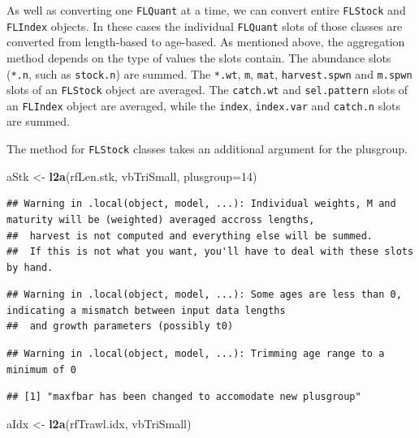 \documentclass[
]{book}
\newenvironment{Shaded}{\begin{snugshade}}{\end{snugshade}}
\newcommand{\AttributeTok}[1]{\textcolor[rgb]{0.13,0.29,0.53}{#1}}
\newcommand{\DecValTok}[1]{\textcolor[rgb]{0.00,0.00,0.81}{#1}}
\newcommand{\FunctionTok}[1]{\textcolor[rgb]{0.13,0.29,0.53}{\textbf{#1}}}
\newcommand{\NormalTok}[1]{#1}
\newcommand{\OtherTok}[1]{\textcolor[rgb]{0.56,0.35,0.01}{#1}}
\begin{document}
As well as converting one \texttt{FLQuant} at a time, we can convert entire \texttt{FLStock} and \texttt{FLIndex} objects. In these cases the individual \texttt{FLQuant} slots of those classes are converted from length-based to age-based. As mentioned above, the aggregation method depends on the type of values the slots contain. The abundance slots (\texttt{*.n}, such as \texttt{stock.n}) are summed. The \texttt{*.wt}, \texttt{m}, \texttt{mat}, \texttt{harvest.spwn} and \texttt{m.spwn} slots of an \texttt{FLStock} object are averaged. The \texttt{catch.wt} and \texttt{sel.pattern} slots of an \texttt{FLIndex} object are averaged, while the \texttt{index}, \texttt{index.var} and \texttt{catch.n} slots are summed.

The method for \texttt{FLStock} classes takes an additional argument for the plusgroup.

\begin{Shaded}
\begin{Highlighting}[]
\NormalTok{aStk }\OtherTok{\textless{}{-}} \FunctionTok{l2a}\NormalTok{(rfLen.stk, vbTriSmall, }\AttributeTok{plusgroup=}\DecValTok{14}\NormalTok{)}
\end{Highlighting}
\end{Shaded}

\begin{verbatim}
## Warning in .local(object, model, ...): Individual weights, M and maturity will be (weighted) averaged accross lengths,
##  harvest is not computed and everything else will be summed.
##  If this is not what you want, you'll have to deal with these slots by hand.
\end{verbatim}

\begin{verbatim}
## Warning in .local(object, model, ...): Some ages are less than 0, indicating a mismatch between input data lengths
##  and growth parameters (possibly t0)
\end{verbatim}

\begin{verbatim}
## Warning in .local(object, model, ...): Trimming age range to a minimum of 0
\end{verbatim}

\begin{verbatim}
## [1] "maxfbar has been changed to accomodate new plusgroup"
\end{verbatim}

\begin{Shaded}
\begin{Highlighting}[]
\NormalTok{aIdx }\OtherTok{\textless{}{-}} \FunctionTok{l2a}\NormalTok{(rfTrawl.idx, vbTriSmall)}
\end{Highlighting}
\end{Shaded}
\end{document}
